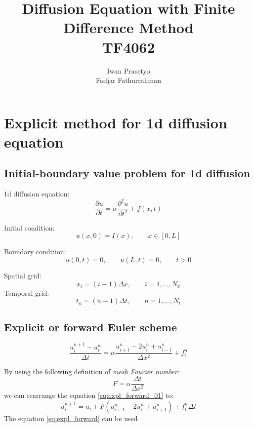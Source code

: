 \documentclass[a4paper,12pt]{article}
\begin{document}
\title{Diffusion Equation with Finite Difference Method \\
TF4062}
\author{Iwan Prasetyo \\
Fadjar Fathurrahman}
\date{}
\maketitle


\section{Explicit method for 1d diffusion equation}


\subsection{Initial-boundary value problem for 1d diffusion}

1d diffusion equation:
\begin{equation}
\frac{\partial u}{\partial t} = \alpha \frac{\partial^2 u}{\partial t^2} + f(x,t)
\end{equation}

Initial condition:
\begin{equation}
u(x,0) = I(x), \qquad x \in [0,L]
\end{equation}

Boundary condition:
\begin{equation}
u(0,t) = 0, \qquad u(L,t) = 0, \qquad t > 0
\end{equation}

Spatial grid:
\begin{equation}
x_{i} = (i-1)\Delta x, \qquad i = 1, \ldots, N_{x}
\end{equation}
Temporal grid:
\begin{equation}
t_{n} = (n-1)\Delta t, \qquad n = 1, \ldots, N_{t}
\end{equation}


\subsection{Explicit or forward Euler scheme}

\begin{equation}
\frac{u_{i}^{n+1} - u_{i}^{n}}{\Delta t} = \alpha \frac{u_{i+1}^{n} -2u_{i}^{n} + u_{i-1}^{n}}{\Delta x^2} + f_{i}^{n}
\label{eq:expl_forward_01}
\end{equation}

By using the following definition of \textit{mesh Fourier number}:
\begin{equation}
F = \alpha \frac{\Delta t}{\Delta x^2}
\end{equation}
we can rearrange the equation \eqref{eq:expl_forward_01} to:
\begin{equation}
u_{i}^{n+1} = u_{i} + F\left( u_{i+1}^{n} - 2u_{i}^{n} + u_{i+1}^{n} \right) +
f_{i}^{n}\Delta t
\label{eq:expl_forward}
\end{equation}
The equation \eqref{eq:expl_forward} can be used 
\end{document}
